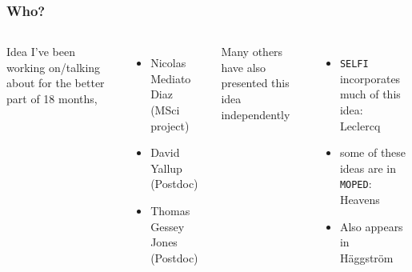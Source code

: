 \documentclass[aspectratio=169]{beamer}
\begin{document}
\begin{frame}
    \frametitle{Who?}
    \begin{columns}
        Idea I've been working on/talking about for the better part of 18 months,
        \begin{itemize}
            \item Nicolas Mediato Diaz (MSci project)
            \item David Yallup (Postdoc)
            \item Thomas Gessey Jones (Postdoc)
        \end{itemize}

        Many others have also presented this idea independently
        \begin{itemize}
            \item \texttt{SELFI} incorporates much of this idea: Leclercq~
            \item some of these ideas are in \texttt{MOPED}: Heavens~
            \item Also appears in Häggström~
        \end{itemize}


\end{columns}
\end{frame}
\end{document}
